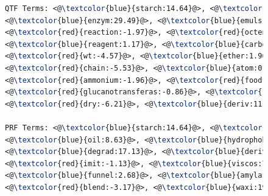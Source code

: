 \begin{figure}[t!]
\begin{framed}
\begin{lstlisting}[basicstyle=\small\ttfamily , linewidth=\columnwidth,breaklines=true, language=TeX]
QTF Terms: <@\textcolor{blue}{starch:14.64}@>, <@\textcolor{blue}{emulsifi:6.72}@>, <@\textcolor{red}{succin:-3.46}@>, 
<@\textcolor{blue}{enzym:29.49}@>, <@\textcolor{blue}{emuls:12.66}@>, <@\textcolor{blue}{hydrophob:5.45}@>, <@\textcolor{red}{anhydrid:-5.47}@>, 
<@\textcolor{red}{reaction:-1.97}@>, <@\textcolor{red}{octenyl:-0.66}@>, <@\textcolor{blue}{stabil:3.64}@>, <@\textcolor{blue}{alkenyl:0.06}@>, 
<@\textcolor{blue}{reagent:1.17}@>, <@\textcolor{blue}{carbon:0.12}@>, <@\textcolor{blue}{potato:3.74}@>, <@\textcolor{red}{alkyl:-0.33}@>, 
<@\textcolor{red}{wt:-4.57}@>, <@\textcolor{blue}{ether:1.96}@>, <@\textcolor{red}{enzymat:-3.45}@>, <@\textcolor{blue}{convers:10.44}@>, 
<@\textcolor{red}{chain:-5.53}@>, <@\textcolor{blue}{atom:0.03}@>, <@\textcolor{red}{ph:-4.55}@>, <@\textcolor{red}{treat:-0.89}@>, 
<@\textcolor{red}{ammonium:-1.96}@>, <@\textcolor{red}{food:-11.94}@>, <@\textcolor{red}{amylos:-20.15}@>, 
<@\textcolor{red}{glucanotransferas:-0.86}@>, <@\textcolor{red}{glycidyl:-0.40}@>, <@\textcolor{red}{glycosyl:-0.02}@>, 
<@\textcolor{red}{dry:-6.21}@>, <@\textcolor{blue}{deriv:11.97}@>, <@\textcolor{blue}{transferas:0.89}@>, <@\textcolor{red}{foam:-0.49}@>, 

PRF Terms: <@\textcolor{blue}{starch:14.64}@>, <@\textcolor{blue}{encapsul:17.50}@>, <@\textcolor{red}{chees:-4.22}@>, 
<@\textcolor{blue}{oil:8.63}@>, <@\textcolor{blue}{hydrophob:5.45}@>, <@\textcolor{blue}{agent:5.19}@>, <@\textcolor{red}{casein:-2.19}@>, 
<@\textcolor{blue}{degrad:17.13}@>, <@\textcolor{blue}{deriv:11.97}@>, <@\textcolor{blue}{tablet:5.30}@>, <@\textcolor{red}{debranch:-10.58}@>, 
<@\textcolor{red}{imit:-1.13}@>, <@\textcolor{blue}{viscos:7.77}@>, <@\textcolor{blue}{oxid:5.97}@>, <@\textcolor{blue}{activ:5.98}@>, <@\textcolor{blue}{osa:9.32}@>, 
<@\textcolor{blue}{funnel:2.68}@>, <@\textcolor{blue}{amylas:26.06}@>, <@\textcolor{red}{amylopectin:-7.14}@>, <@\textcolor{blue}{maiz:20.61}@>, 
<@\textcolor{red}{blend:-3.17}@>, <@\textcolor{blue}{waxi:19.41}@>, <@\textcolor{blue}{convert:31.81}@>, 


\end{lstlisting}
\end{framed}
\end{figure}
